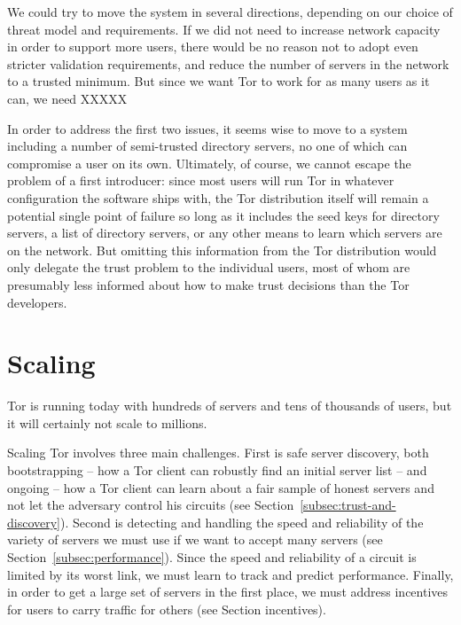 \documentclass{llncs}
\begin{document}
We could try to move the system in several directions, depending on our
choice of threat model and requirements.  If we did not need to increase
network capacity in order to support more users, there would be no reason not
to adopt even stricter validation requirements, and reduce the number of
servers in the network to a trusted minimum.  But since we want Tor to work
for as many users as it can, we need XXXXX

In order to address the first two issues, it seems wise to move to a system
including a number of semi-trusted directory servers, no one of which can
compromise a user on its own.  Ultimately, of course, we cannot escape the
problem of a first introducer: since most users will run Tor in whatever
configuration the software ships with, the Tor distribution itself will
remain a potential single point of failure so long as it includes the seed
keys for directory servers, a list of directory servers, or any other means
to learn which servers are on the network.  But omitting this information
from the Tor distribution would only delegate the trust problem to the
individual users, most of whom are presumably less informed about how to make
trust decisions than the Tor developers.


\section{Scaling}

Tor is running today with hundreds of servers and tens of thousands of
users, but it will certainly not scale to millions.

Scaling Tor involves three main challenges.  First is safe server
discovery, both bootstrapping -- how a Tor client can robustly find an
initial server list -- and ongoing -- how a Tor client can learn about
a fair sample of honest servers and not let the adversary control his
circuits (see Section~\ref{subsec:trust-and-discovery}).  Second is detecting and handling the speed
and reliability of the variety of servers we must use if we want to
accept many servers (see Section~\ref{subsec:performance}).
Since the speed and reliability of a circuit is limited by its worst link,
we must learn to track and predict performance.  Finally, in order to get
a large set of servers in the first place, we must address incentives
for users to carry traffic for others (see Section incentives).
\end{document}
